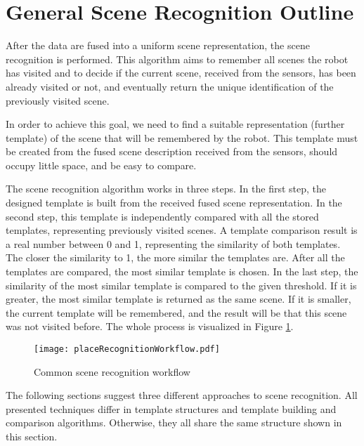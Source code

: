 \section{General Scene Recognition Outline}\label{section:placeOutline}

After the data are fused into a uniform scene representation, the scene recognition is performed. This algorithm aims to remember all scenes the robot has visited and to decide if the current scene, received from the sensors, has been already visited or not, and eventually return the unique identification of the previously visited scene.\par
In order to achieve this goal, we need to find a suitable representation (further template) of the scene that will be remembered by the robot. This template must be created from the fused scene description received from the sensors, should occupy little space, and be easy to compare.\par
The scene recognition algorithm works in three steps. In the first step, the designed template is built from the received fused scene representation. In the second step, this template is independently compared with all the stored templates, representing previously visited scenes. A template comparison result is a real number between 0 and 1, representing the similarity of both templates. The closer the similarity to 1, the more similar the templates are. After all the templates are compared, the most similar template is chosen. In the last step, the similarity of the most similar template is compared to the given threshold. If it is greater, the most similar template is returned as the same scene. If it is smaller, the current template will be remembered, and the result will be that this scene was not visited before. The whole process is visualized in Figure \ref{fig:placeRecognitionWorkflow}.\par

\begin{figure}[htpb]
    \centering
    \texttt{[image: placeRecognitionWorkflow.pdf]}
    \caption{Common scene recognition workflow} \label{fig:placeRecognitionWorkflow}
\end{figure}

The following sections suggest three different approaches to scene recognition. All presented techniques differ in template structures and template building and comparison algorithms. Otherwise, they all share the same structure shown in this section.
